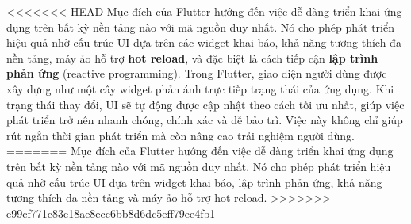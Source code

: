 \documentclass[../DoAn.tex]{subfiles}
\numberwithin{figure}{chapter}
\begin{document}
<<<<<<< HEAD
Mục đích của Flutter hướng đến việc dễ dàng triển khai ứng dụng trên bất kỳ nền tảng nào với mã nguồn duy nhất. Nó cho phép phát triển hiệu quả nhờ cấu trúc UI dựa trên các widget khai báo, khả năng tương thích đa nền tảng, máy ảo hỗ trợ \textbf{hot reload}, và đặc biệt là cách tiếp cận \textbf{lập trình phản ứng} (reactive programming). Trong Flutter, giao diện người dùng được xây dựng như một cây widget phản ánh trực tiếp trạng thái của ứng dụng. Khi trạng thái thay đổi, UI sẽ tự động được cập nhật theo cách tối ưu nhất, giúp việc phát triển trở nên nhanh chóng, chính xác và dễ bảo trì. Việc này không chỉ giúp rút ngắn thời gian phát triển mà còn nâng cao trải nghiệm người dùng.
=======
Mục đích của Flutter hướng đến việc dễ dàng triển khai ứng dụng trên bất kỳ nền tảng nào với mã nguồn duy nhất. Nó cho phép phát triển hiệu quả nhờ cấu trúc UI dựa trên widget khai báo, lập trình phản ứng, khả năng tương thích đa nền tảng và máy ảo hỗ trợ hot reload. 
>>>>>>> e99cf771c83e18ae8ecc6bb8d6dc5eff79ee4fb1
\end{document}

